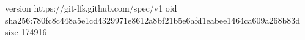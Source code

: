 version https://git-lfs.github.com/spec/v1
oid sha256:780fc8c448a5e1cd4329971e8612a8bf21b5e6afd1eabee1464ca609a268b83d
size 174916
